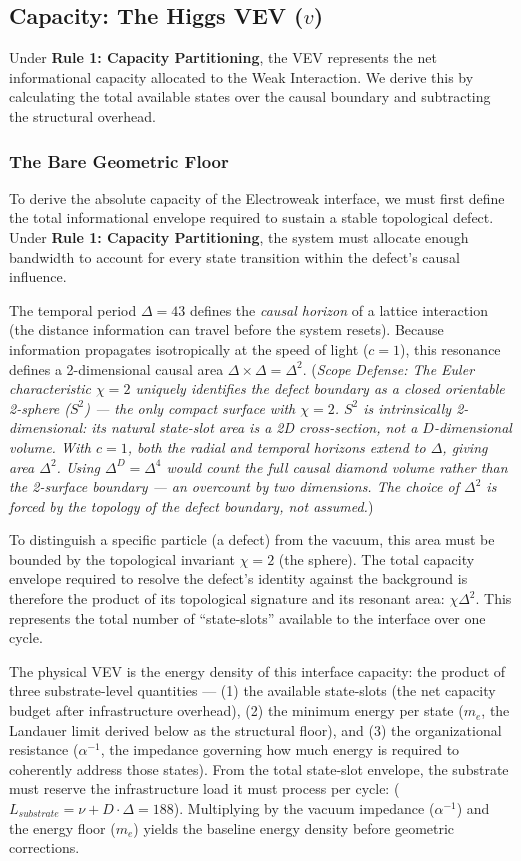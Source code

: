 \subsection{Capacity: The Higgs VEV (\texorpdfstring{$v$}{v})}
Under \textbf{Rule 1: Capacity Partitioning}, the VEV represents the net informational capacity allocated to the Weak Interaction. We derive this by calculating the total available states over the causal boundary and subtracting the structural overhead.

\subsubsection{The Bare Geometric Floor}
To derive the absolute capacity of the Electroweak interface, we must first define the total informational envelope required to sustain a stable topological defect. Under \textbf{Rule 1: Capacity Partitioning}, the system must allocate enough bandwidth to account for every state transition within the defect's causal influence.

The temporal period $\Delta=43$ defines the \textit{causal horizon} of a lattice interaction (the distance information can travel before the system resets). Because information propagates isotropically at the speed of light ($c=1$), this resonance defines a 2-dimensional causal area $\Delta \times \Delta = \Delta^2$. (\textit{Scope Defense: The Euler characteristic $\chi=2$ uniquely identifies the defect boundary as a closed orientable 2-sphere ($S^2$) --- the only compact surface with $\chi=2$. $S^2$ is intrinsically 2-dimensional: its natural state-slot area is a 2D cross-section, not a $D$-dimensional volume. With $c=1$, both the radial and temporal horizons extend to $\Delta$, giving area $\Delta^2$. Using $\Delta^D = \Delta^4$ would count the full causal diamond volume rather than the 2-surface boundary --- an overcount by two dimensions. The choice of $\Delta^2$ is forced by the topology of the defect boundary, not assumed.})

To distinguish a specific particle (a defect) from the vacuum, this area must be bounded by the topological invariant $\chi=2$ (the sphere). The total capacity envelope required to resolve the defect's identity against the background is therefore the product of its topological signature and its resonant area: $\chi \Delta^2$. This represents the total number of ``state-slots'' available to the interface over one cycle.

The physical VEV is the energy density of this interface capacity: the product of three substrate-level quantities --- (1) the available state-slots (the net capacity budget after infrastructure overhead), (2) the minimum energy per state ($m_e$, the Landauer limit derived below as the structural floor), and (3) the organizational resistance ($\alpha^{-1}$, the impedance governing how much energy is required to coherently address those states). From the total state-slot envelope, the substrate must reserve the infrastructure load it must process per cycle: ($L_{substrate} = \nu + D \cdot \Delta = 188$\cite{meyer_ieaction_2026}). Multiplying by the vacuum impedance ($\alpha^{-1}$) and the energy floor ($m_e$) yields the baseline energy density before geometric corrections.

